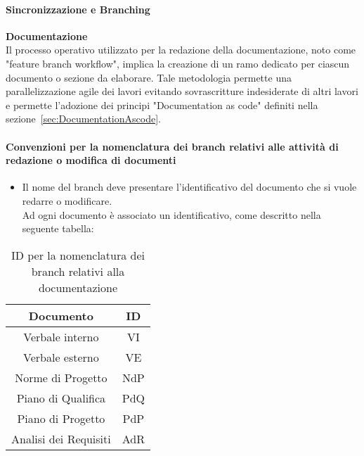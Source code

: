 \hypertarget{par:sincronizzazione&branching}{\paragraph{Sincronizzazione e Branching}}
\textbf{Documentazione} \\
Il processo operativo utilizzato per la redazione della documentazione, noto come "feature branch workflow", implica la creazione di un ramo dedicato per ciascun documento o sezione da elaborare.
Tale metodologia permette una parallelizzazione agile dei lavori evitando sovrascritture indesiderate di altri lavori e permette l'adozione dei principi "Documentation as code" definiti nella sezione~\ref{sec:DocumentationAscode}. \\ 

\paragraph*{\hypertarget{par:convezioninomenclaturabranchdocumenti}{\textbf{Convenzioni per la nomenclatura dei branch relativi alle attività di redazione o modifica di documenti}}}

\begin{itemize}
    \item Il nome del branch deve presentare l'identificativo del documento che si vuole redarre o modificare. \\
    Ad ogni documento è associato un identificativo, come descritto nella seguente tabella:
\end{itemize}

\begin{table}[H]
    \centering
    \begin{tabular}{|c|c|}
        \hline
        Documento & ID \\
        \hline
        Verbale interno & VI \\
        Verbale esterno & VE \\
        Norme di Progetto & NdP \\
        Piano di Qualifica & PdQ \\
        Piano di Progetto & PdP \\ 
        Analisi dei Requisiti & AdR \\
        \hline
    \end{tabular}
    \caption{ID per la nomenclatura dei branch relativi alla documentazione}
\end{table}

